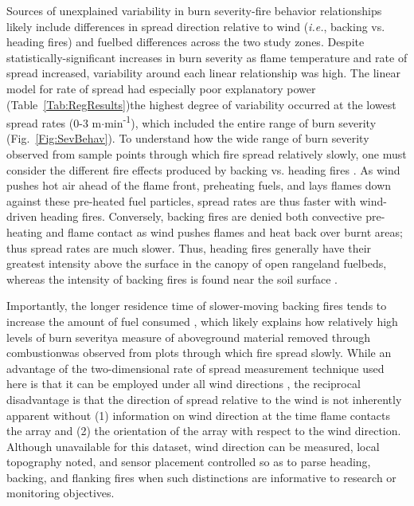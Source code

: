 \documentclass[fire,article,submit,oneauthor,pdftex]{Definitions/mdpi}
\begin{document}

Sources of unexplained variability in burn severity-fire behavior relationships likely include differences in spread direction relative to wind (\emph{i.e.}, backing vs. heading fires) and fuelbed differences across the two study zones.
Despite statistically-significant increases in burn severity as flame temperature and rate of spread increased, variability around each linear relationship was high. 
The linear model for rate of spread had especially poor explanatory power (Table~\ref{Tab:RegResults})\textemdash the highest degree of variability occurred at the lowest spread rates (0-3 m$\cdot$min\textsuperscript{-1}), which included the entire range of burn severity (Fig.~\ref{Fig:SevBehav}). 
To understand how the wide range of burn severity observed from sample points through which fire spread relatively slowly, one must consider the different fire effects produced by backing vs. heading fires \cite{rothermel1980}. 
As wind pushes hot air ahead of the flame front, preheating fuels, and lays flames down against these pre-heated fuel particles, spread rates are thus faster with wind-driven heading fires. 
Conversely, backing fires are denied both convective pre-heating and flame contact as wind pushes flames and heat back over burnt areas; thus spread rates are much slower. 
Thus, heading fires generally have their greatest intensity above the surface in the canopy of open rangeland fuelbeds, whereas the intensity of backing fires is found near the soil surface \cite{trollope1978}.

Importantly, the longer residence time of slower-moving backing fires tends to increase the amount of fuel consumed \cite{trollope1984}, which likely explains how relatively high levels of burn severity\textemdash a measure of aboveground material removed through combustion\textemdash was observed from plots through which fire spread slowly. 
While an advantage of the two-dimensional rate of spread measurement technique used here is that it can be employed under all wind directions \cite{finney2021}, the reciprocal disadvantage is that the direction of spread relative to the wind is not inherently apparent without (1) information on wind direction at the time flame contacts the array and (2) the orientation of the array with respect to the wind direction. 
Although unavailable for this dataset, wind direction can be measured, local topography noted, and sensor placement controlled so as to parse heading, backing, and flanking fires when such distinctions are informative to research or monitoring objectives. 
\end{document}
